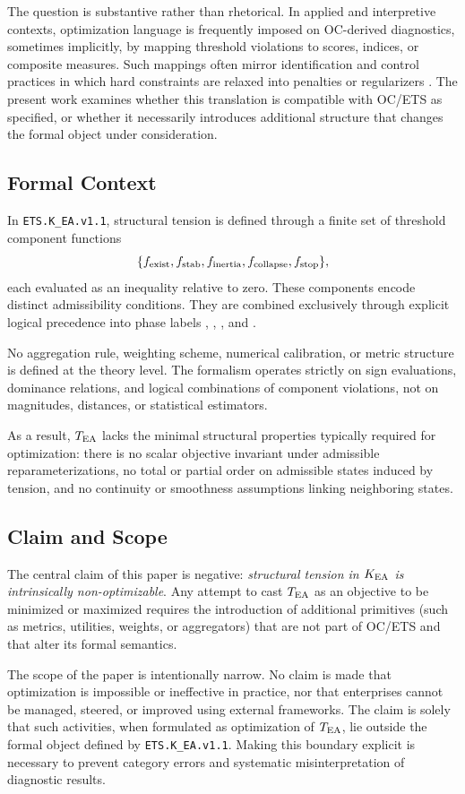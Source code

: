 The question is substantive rather than rhetorical. In applied and
interpretive contexts, optimization language is frequently imposed on
OC-derived diagnostics, sometimes implicitly, by mapping threshold
violations to scores, indices, or composite measures. Such mappings often
mirror identification and control practices in which hard constraints are
relaxed into penalties or regularizers
\cite{walter1982,walter1997}. The present work examines whether this
translation is compatible with OC/ETS as specified, or whether it
necessarily introduces additional structure that changes the formal object
under consideration.

\subsection{Formal Context}

In \texttt{ETS.K\_EA.v1.1}, structural tension is defined through a finite
set of threshold component functions
\[
\{f_{\text{exist}},f_{\text{stab}},f_{\text{inertia}},f_{\text{collapse}},f_{\text{stop}}\},
\]
each evaluated as an inequality relative to zero. These components encode
distinct admissibility conditions. They are combined exclusively through
explicit logical precedence into phase labels
\PHASESTOP, \PHASECOLLAPSE, \PHASEINERTIA, and \PHASESUCCESS.

No aggregation rule, weighting scheme, numerical calibration, or metric
structure is defined at the theory level. The formalism operates strictly
on sign evaluations, dominance relations, and logical combinations of
component violations, not on magnitudes, distances, or statistical
estimators.

As a result, $T_{\mathrm{EA}}$ lacks the minimal structural properties typically
required for optimization: there is no scalar objective invariant under
admissible reparameterizations, no total or partial order on admissible
states induced by tension, and no continuity or smoothness assumptions
linking neighboring states.

\subsection{Claim and Scope}

The central claim of this paper is negative:
\emph{structural tension in $K_{\mathrm{EA}}$ is intrinsically non-optimizable}.
Any attempt to cast $T_{\mathrm{EA}}$ as an objective to be minimized or maximized
requires the introduction of additional primitives (such as metrics,
utilities, weights, or aggregators) that are not part of OC/ETS and that
alter its formal semantics.

The scope of the paper is intentionally narrow. No claim is made that
optimization is impossible or ineffective in practice, nor that
enterprises cannot be managed, steered, or improved using external
frameworks. The claim is solely that such activities, when formulated as
optimization of $T_{\mathrm{EA}}$, lie outside the formal object defined by
\texttt{ETS.K\_EA.v1.1}. Making this boundary explicit is necessary to
prevent category errors and systematic misinterpretation of diagnostic
results.

